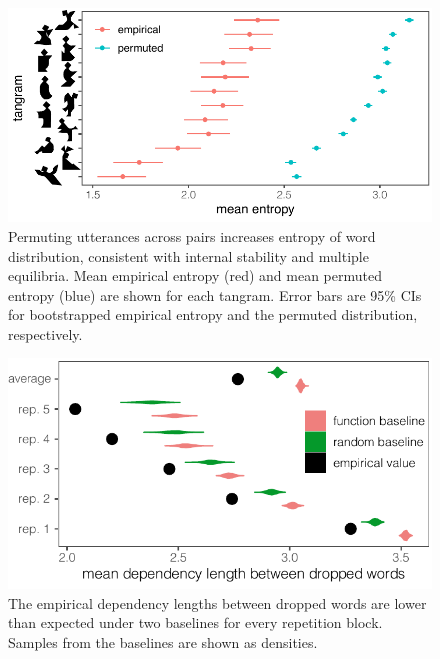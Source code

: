 \documentclass[alpha-refs]{wiley-article}
\begin{document}
\begin{figure}[h!]
\centering
\includegraphics[scale=.9]{Sup_Mat_permutedDiscrete.pdf}
\caption{Permuting utterances across pairs increases entropy of word distribution, consistent with internal stability and multiple equilibria. Mean empirical entropy (red) and mean permuted entropy (blue) are shown for each tangram. Error bars are 95\% CIs for bootstrapped empirical entropy and the permuted distribution, respectively.}
\label{fig:permuted}
\end{figure}

\begin{figure}[h!]
\centering
\includegraphics[scale=.8]{Sup_Mat_syntactic_reduction_baselines.pdf}
\caption{The empirical dependency lengths between dropped words are lower than expected under two baselines for every repetition block. Samples from the baselines are shown as densities. }
\label{fig:dependency_length_by_rep}
\end{figure}
\end{document}

